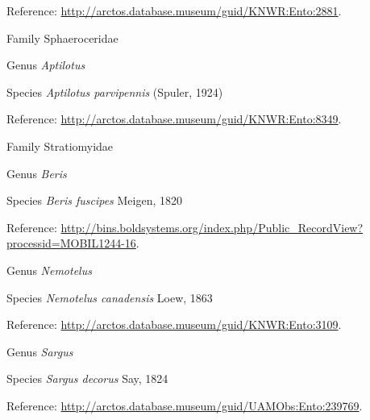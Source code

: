 \documentclass[9pt, article]{memoir}
\begin{document}
\begin{multicols}{2}
\vspace{6pt}Reference: 
\url{http://arctos.database.museum/guid/KNWR:Ento:2881}.

\vspace{6pt}\noindent\hspace{24pt}Family Sphaeroceridae


\vspace{6pt}\noindent\hspace{30pt}Genus \textit{Aptilotus}


\vspace{6pt}\noindent\hspace{36pt}Species \textit{Aptilotus parvipennis} (Spuler, 1924)


\vspace{6pt}Reference: 
\url{http://arctos.database.museum/guid/KNWR:Ento:8349}.

\vspace{6pt}\noindent\hspace{24pt}Family Stratiomyidae


\vspace{6pt}\noindent\hspace{30pt}Genus \textit{Beris}


\vspace{6pt}\noindent\hspace{36pt}Species \textit{Beris fuscipes} Meigen, 1820


\vspace{6pt}Reference: 
\url{http://bins.boldsystems.org/index.php/Public_RecordView?processid=MOBIL1244-16}.

\vspace{6pt}\noindent\hspace{30pt}Genus \textit{Nemotelus}


\vspace{6pt}\noindent\hspace{36pt}Species \textit{Nemotelus canadensis} Loew, 1863


\vspace{6pt}Reference: 
\url{http://arctos.database.museum/guid/KNWR:Ento:3109}.

\vspace{6pt}\noindent\hspace{30pt}Genus \textit{Sargus}


\vspace{6pt}\noindent\hspace{36pt}Species \textit{Sargus decorus} Say, 1824


\vspace{6pt}Reference: 
\url{http://arctos.database.museum/guid/UAMObs:Ento:239769}.


\end{multicols}
\end{document}
